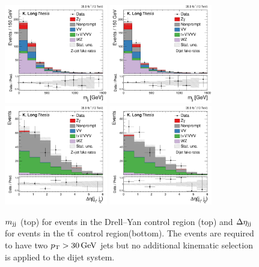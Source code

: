 \begin{figure}[htbp]
  \centering
   \includegraphics[width=0.4\textwidth]{figures/AnalysisProcedure/mjj_3lDYControl.pdf}
   \includegraphics[width=0.4\textwidth]{figures/AnalysisProcedure/mjj_3lDYControl_dijetFRs.pdf}
   \includegraphics[width=0.4\textwidth]{figures/AnalysisProcedure/dEtajj_3lTTbarControl.pdf}
   \includegraphics[width=0.4\textwidth]{figures/AnalysisProcedure/dEtajj_3lTTbarControl_dijetFRs.pdf}
  \caption{
    $m_{\mathrm{jj}}$ (top) for events in the Drell--Yan control region (top)
    and $\Delta\eta_{\mathrm{jj}}$ for events in the ${\mathrm{t}\overline{\mathrm{t}}}$ control region(bottom).
    The events are required to have two $p_{\mathrm{T}} > 30\,\text{Ge\hspace{-.08em}V}$
    jets but no additional kinematic selection is applied to the dijet system.
        }
 \label{fig:fakeRates2D}
\end{figure}

